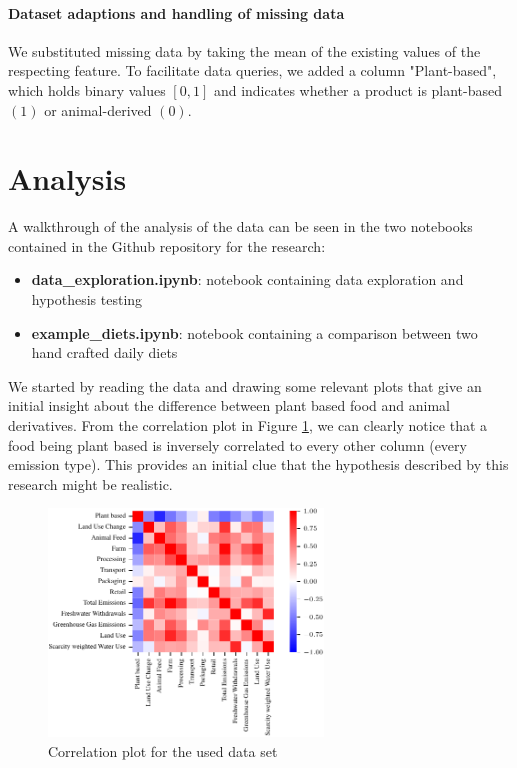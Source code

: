 \documentclass{article}
\begin{document}
\paragraph{Dataset adaptions and handling of missing data}

We substituted  missing  data by taking the mean of the existing values of the respecting feature. To facilitate data queries, we added a column "Plant-based", which holds binary values $[0,1]$ and indicates whether a product is plant-based $(1)$ or animal-derived $(0)$.


\section{Analysis}
\label{analysis}

A walkthrough of the analysis of the data can be seen in the two notebooks contained in the Github repository for the research:

\begin{itemize}
    \item \textbf{data\_exploration.ipynb}: notebook containing data exploration and hypothesis testing
    \item \textbf{example\_diets.ipynb}: notebook containing a comparison between two hand crafted daily diets
\end{itemize}

We started by reading the data and drawing some relevant plots that give an initial insight about the difference between plant based food and animal derivatives. From the correlation plot in Figure \ref{fig:corr}, we can clearly notice that a food being plant based is inversely correlated to every other column (every emission type). This provides an initial clue that the hypothesis described by this research might be realistic. 

\begin{figure}[h]
  \centering
  \includegraphics[width=0.65\textwidth]{figures/heat-map.pdf}
  \caption{Correlation plot for the used data set}
  \label{fig:corr}
\end{figure}
\end{document}
